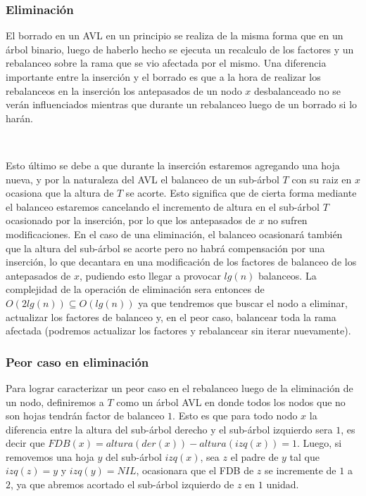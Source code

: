 \subsubsection{Eliminaci\'on}

El borrado en un AVL en un principio se realiza de la misma forma que en un \'arbol binario, luego de haberlo hecho se ejecuta un recalculo de los factores y un rebalanceo sobre la rama que se vio afectada por el mismo. Una diferencia importante entre la inserci\'on y el borrado es que a la hora de realizar los rebalanceos en la inserci\'on los antepasados de un nodo $x$ desbalanceado no se ver\'an influenciados mientras que durante un rebalanceo luego de un borrado si lo har\'an. 

~

Esto \'ultimo se debe a que durante la inserci\'on estaremos agregando una hoja nueva, y por la naturaleza del AVL el balanceo de un sub-\'arbol $T$ con su raiz en $x$ ocasiona que la altura de $T$ se acorte. Esto significa que de cierta forma mediante el balanceo estaremos cancelando el incremento de altura en el sub-\'arbol $T$ ocasionado por la inserci\'on, por lo que los antepasados de $x$ no sufren modificaciones. En el caso de una eliminaci\'on, el balanceo ocasionar\'a tambi\'en que la altura del sub-\'arbol se acorte pero no habr\'a compensaci\'on por una inserci\'on, lo que decantara en una modificaci\'on de los factores de balanceo de los antepasados de $x$, pudiendo esto llegar a provocar $lg(n)$ balanceos. La complejidad de la operaci\'on de eliminaci\'on sera entonces de $O(2lg(n)) \subseteq O(lg(n))$ ya que tendremos que buscar el nodo a eliminar, actualizar los factores de balanceo y, en el peor caso, balancear toda la rama afectada (podremos actualizar los factores y rebalancear sin iterar 
nuevamente).

\subsubsection{Peor caso en eliminaci\'on}

Para lograr caracterizar un peor caso en el rebalanceo luego de la eliminaci\'on de un nodo, definiremos a $T$ como un \'arbol AVL en donde todos los nodos que no son hojas tendr\'an factor de balanceo $1$. Esto es que para todo nodo $x$ la diferencia entre la altura del sub-\'arbol derecho y el sub-\'arbol izquierdo sera $1$, es decir que $FDB(x) = altura(der(x))-altura(izq(x)) = 1$. Luego, si removemos una hoja $y$ del sub-\'arbol $izq(x)$, sea $z$ el padre de $y$ tal que $izq(z)=y$ y $izq(y) = NIL$, ocasionara que el FDB de $z$ se incremente de $1$ a $2$, ya que abremos acortado el sub-\'arbol izquierdo de $z$ en $1$ unidad.

